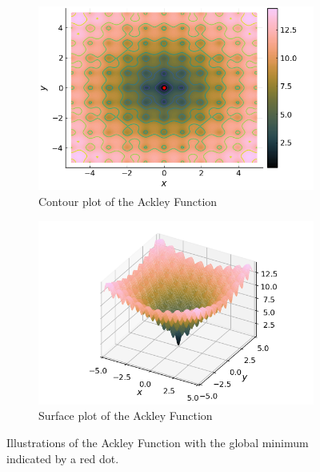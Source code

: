 \begin{figure}[ht!]
  \centering
  \begin{subfigure}[b]{0.45\textwidth}
    \centering
    \includegraphics[width=\textwidth]{img/test_functions/ackley_contour.png}
    \caption{Contour plot of the Ackley Function}
  \end{subfigure}
  \hfill
  \begin{subfigure}[b]{0.45\textwidth}
    \centering
    \includegraphics[width=\textwidth]{img/test_functions/ackley_surface.png}
    \caption{Surface plot of the Ackley Function}
  \end{subfigure}
  \caption{
    Illustrations of the Ackley Function with the global minimum indicated by a
    red dot.
  }
  \label{fig:app:test:ackley}
\end{figure}
